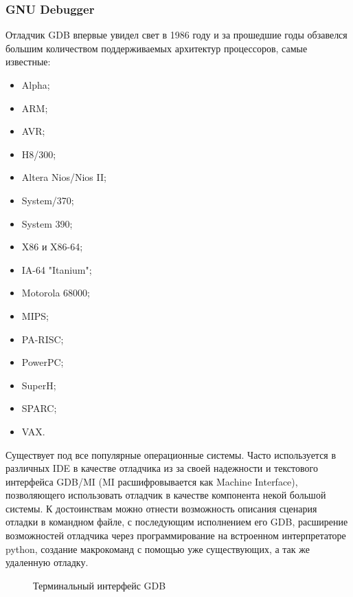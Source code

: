 \subsubsection{GNU Debugger}\label{sec:ch1/sec3/sub2/sub2}
Отладчик GDB впервые увидел свет в 1986 году и за прошедшие годы обзавелся
большим количеством поддерживаемых архитектур процессоров, самые известные:
\begin{itemize}
    \item Alpha;
    \item ARM;
    \item AVR;
    \item H8/300;
    \item Altera Nios/Nios II;
    \item System/370;
    \item System 390;
    \item X86 и X86-64;
    \item IA-64 "Itanium";
    \item Motorola 68000;
    \item MIPS;
    \item PA-RISC;
    \item PowerPC;
    \item SuperH;
    \item SPARC;
    \item VAX.
\end{itemize}
Существует под все популярные операционные системы. Часто используется в различных IDE в качестве
отладчика из за своей надежности и текстового интерфейса GDB/MI (MI расшифровывается как Machine
Interface), позволяющего использовать отладчик в качестве компонента некой большой системы.
К достоинствам можно отнести возможность описания сценария отладки в командном файле,
с последующим исполнением его GDB, расширение возможностей отладчика через программирование
на встроенном интерпретаторе python, создание макрокоманд с помощью уже существующих,
а так же удаленную отладку.
\begin{figure}[!htbp]
    \caption{Терминальный интерфейс GDB \label{fig:gdb-tui}}
\end{figure}

